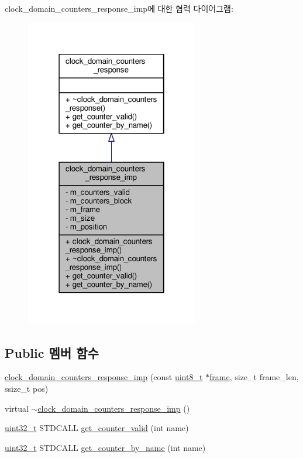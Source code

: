 clock\+\_\+domain\+\_\+counters\+\_\+response\+\_\+imp에 대한 협력 다이어그램\+:
\nopagebreak
\begin{figure}[H]
\begin{center}
\leavevmode
\includegraphics[width=214pt]{classavdecc__lib_1_1clock__domain__counters__response__imp__coll__graph}
\end{center}
\end{figure}
\subsection*{Public 멤버 함수}
\begin{DoxyCompactItemize}
\item 
\hyperlink{classavdecc__lib_1_1clock__domain__counters__response__imp_acaf0bb64fc9852f7a1925a459f8740a5}{clock\+\_\+domain\+\_\+counters\+\_\+response\+\_\+imp} (const \hyperlink{stdint_8h_aba7bc1797add20fe3efdf37ced1182c5}{uint8\+\_\+t} $\ast$\hyperlink{gst__avb__playbin_8c_ac8e710e0b5e994c0545d75d69868c6f0}{frame}, size\+\_\+t frame\+\_\+len, ssize\+\_\+t pos)
\item 
virtual \hyperlink{classavdecc__lib_1_1clock__domain__counters__response__imp_a675395d26339dbbd407a644981983f0c}{$\sim$clock\+\_\+domain\+\_\+counters\+\_\+response\+\_\+imp} ()
\item 
\hyperlink{parse_8c_a6eb1e68cc391dd753bc8ce896dbb8315}{uint32\+\_\+t} S\+T\+D\+C\+A\+LL \hyperlink{classavdecc__lib_1_1clock__domain__counters__response__imp_a192c298bbf4dbeef7d3d88d892732455}{get\+\_\+counter\+\_\+valid} (int name)
\item 
\hyperlink{parse_8c_a6eb1e68cc391dd753bc8ce896dbb8315}{uint32\+\_\+t} S\+T\+D\+C\+A\+LL \hyperlink{classavdecc__lib_1_1clock__domain__counters__response__imp_a5746c406e06afbbd5f35819f8e378476}{get\+\_\+counter\+\_\+by\+\_\+name} (int name)
\end{DoxyCompactItemize}
